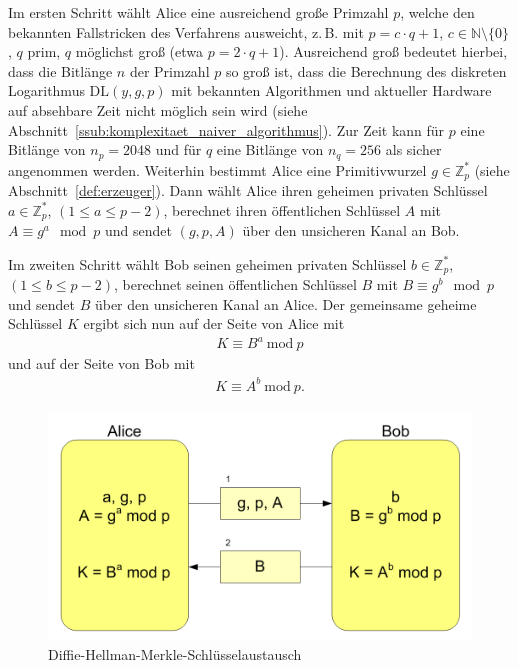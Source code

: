 \documentclass[
  a4paper,
  11pt,
]{scrartcl}
\theoremstyle{plain}
\theoremstyle{definition}
\theoremstyle{remark}
\newcommand{\N}{\mathbb{N}}
\newcommand{\Z}{\mathbb{Z}}
\newcommand{\Mod}[1]{\ \mathrm{mod}\ #1}
\begin{document}
Im ersten Schritt wählt Alice eine ausreichend große Primzahl $p$, welche den 
bekannten Fallstricken des Verfahrens ausweicht, z.\,B. mit $p = c \cdot q+1$, 
$c \in \N \setminus \{ 0 \}$, $q$ prim, $q$ möglichst groß (etwa 
$p = 2 \cdot q + 1$). 
Ausreichend groß bedeutet hierbei, dass die Bitlänge $n$ der Primzahl $p$ 
so groß ist, dass die Berechnung des diskreten Logarithmus $\text{DL}(y,g,p)$ 
mit bekannten Algorithmen und aktueller Hardware auf absehbare Zeit nicht 
möglich sein wird (siehe Abschnitt~\ref{ssub:komplexitaet_naiver_algorithmus}). 
Zur Zeit kann für $p$ eine Bitlänge von $n_p = 2048$ und für $q$ eine Bitlänge 
von $n_q = 256$ als sicher angenommen werden. 
Weiterhin bestimmt Alice eine Primitivwurzel $g \in \Z_p^*$ (siehe 
Abschnitt~\ref{def:erzeuger}). 
Dann wählt Alice ihren geheimen privaten Schlüssel 
$a \in \Z_p^*$, $(1 \leq a \leq p-2)$, berechnet ihren öffentlichen Schlüssel 
$A$ mit $A \equiv g^a \mod p$ und sendet $(g, p, A)$ über den unsicheren Kanal 
an Bob. 
 
Im zweiten Schritt wählt Bob seinen geheimen privaten Schlüssel $b \in \Z_p^*$, 
$(1 \leq b \leq p-2)$, berechnet seinen öffentlichen Schlüssel $B$ mit 
$B \equiv g^b \mod p$ und sendet $B$ über den unsicheren Kanal an Alice. 
Der gemeinsame geheime Schlüssel $K$ ergibt sich nun auf der Seite von Alice mit
\begin{align*}
	K \equiv B^a \Mod{p}
\end{align*}
und auf der Seite von Bob mit
\begin{align*}
	K \equiv A^b \Mod{p} \text{.}
\end{align*}

\begin{figure}[H]
  \centering
  \includegraphics[width=\textwidth]{Diffie-Hellman-Schluesselaustausch2.png}
  \caption{Diffie-Hellman-Merkle-Schlüsselaustausch}
  \label{fig:dhke}
\end{figure}
\end{document}

